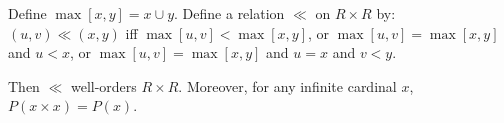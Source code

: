 Define $\max[x,y] = x \cup y$. Define a relation $\ll$ on $R \times R$ by:
$(u,v) \ll (x,y)$ iff $\max[u,v] < \max[x,y]$, or $\max[u,v] = \max[x,y]$ and $u < x$, or $\max[u,v] = \max[x,y]$ and $u = x$ and $v < y$.

Then $\ll$ well-orders $R \times R$. Moreover, for any infinite cardinal $x$, $P(x \times x) = P(x)$.
